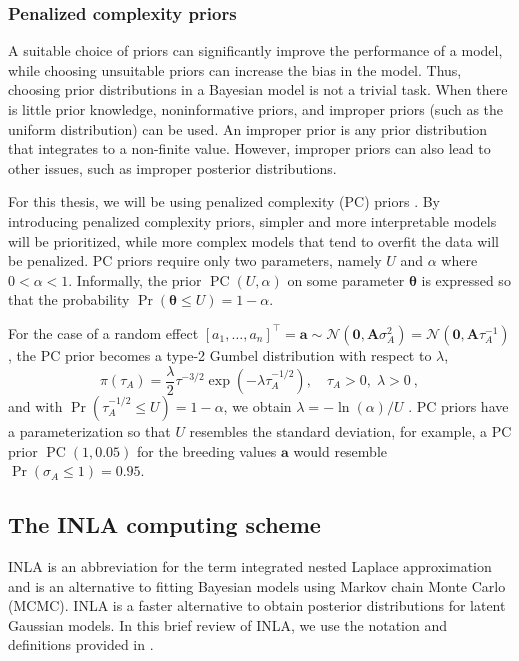 \subsubsection*{Penalized complexity priors}

A suitable choice of priors can significantly improve the performance of a model, while choosing unsuitable priors can increase the bias in the model. Thus, choosing prior distributions in a Bayesian model is not a trivial task. When there is little prior knowledge, noninformative priors, and improper priors (such as the uniform distribution) can be used. An improper prior is any prior distribution that integrates to a non-finite value. However, improper priors can also lead to other issues, such as improper posterior distributions. 

For this thesis, we will be using penalized complexity (PC) priors \autocite{simpson-pcpriors}. By introducing penalized complexity priors, simpler and more interpretable models will be prioritized, while more complex models that tend to overfit the data will be penalized. PC priors require only two parameters, namely $U$ and $\alpha$ where $0<\alpha<1$. Informally, the prior $\operatorname{PC}(U, \alpha)$ on some parameter $\bm\theta$ is expressed so that the probability $\operatorname{Pr}(\bm\theta \le U) = 1-\alpha$.

For the case of a random effect $[a_1, \dots, a_n]^\top = \bm a \sim \mathcal N(\bm 0, \bm A \sigma^2_A) = \mathcal{N}(\bm 0,\bm A \tau_A^{-1})$, the PC prior becomes a type-2 Gumbel distribution with respect to $\lambda$,
\begin{equation}
    \pi(\tau_A) = \frac{\lambda}{2} \tau^{-3/2} \exp(-\lambda\tau_A^{-1/2}),\quad \tau_A>0,\; \lambda>0 \ ,
\end{equation}
and with $\operatorname{Pr}(\tau_A^{-1/2} \le U)=1-\alpha$, we obtain $\lambda=-\ln(\alpha)/U$ \autocite{simpson-pcpriors}. PC priors have a parameterization so that $U$ resembles the standard deviation, for example, a PC prior $\operatorname{PC}(1,0.05)$ for the breeding values $\bm a$ would resemble $\operatorname{Pr}(\sigma_A \le 1) = 0.95$.

\subsection{The INLA computing scheme}
INLA is an abbreviation for the term integrated nested Laplace approximation and is an alternative to fitting Bayesian models using Markov chain Monte Carlo (MCMC). INLA is a faster alternative to obtain posterior distributions for latent Gaussian models. In this brief review of INLA, we use the notation and definitions provided in \textcite{inla-lecturenotes}.

